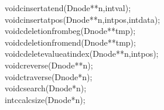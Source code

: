 \documentclass[a4paper, 9pt]{article}
\newcommand\SPC{\hspace*{0.6em}}
\newcommand{\CppAIdentifier}[1]{\textcolor[rgb]{0.88,0.89,0.89}{#1}}
\newcommand{\CppAReservedWord}[1]{\textcolor[rgb]{0.4,0.55,0.69}{#1}}
\newcommand{\CppASpace}[1]{\colorbox[rgb]{0.16,0.19,0.2}{#1}}
\newcommand{\CppASymbol}[1]{\textcolor[rgb]{0.91,0.89,0.72}{#1}}
\begin{document}
\begin{ttfamily}
\CppAReservedWord{void}\CppASpace{\SPC }\CppAIdentifier{cinsertatend}\CppASymbol{(}\CppASpace{\SPC }\CppAIdentifier{Dnode}\CppASymbol{*}\CppASymbol{*}\CppASpace{\SPC }\CppAIdentifier{n}\CppASymbol{,}\CppAReservedWord{int}\CppASpace{\SPC }\CppAIdentifier{val}\CppASymbol{)}\CppASymbol{;}\\
\CppAReservedWord{void}\CppASpace{\SPC }\CppAIdentifier{cinsertatpos}\CppASymbol{(}\CppAIdentifier{Dnode}\CppASymbol{*}\CppASymbol{*}\CppASpace{\SPC }\CppAIdentifier{n}\CppASymbol{,}\CppAReservedWord{int}\CppASpace{\SPC }\CppAIdentifier{pos}\CppASymbol{,}\CppAReservedWord{int}\CppASpace{\SPC }\CppAIdentifier{data}\CppASymbol{)}\CppASymbol{;}\\
\CppAReservedWord{void}\CppASpace{\SPC }\CppAIdentifier{cdeletionfrombeg}\CppASymbol{(}\CppAIdentifier{Dnode}\CppASymbol{*}\CppASymbol{*}\CppASpace{\SPC }\CppAIdentifier{tmp}\CppASpace{\SPC }\CppASymbol{)}\CppASymbol{;}\\
\CppAReservedWord{void}\CppASpace{\SPC }\CppAIdentifier{cdeletionfromend}\CppASymbol{(}\CppAIdentifier{Dnode}\CppASymbol{*}\CppASymbol{*}\CppASpace{\SPC }\CppAIdentifier{tmp}\CppASpace{\SPC }\CppASymbol{)}\CppASymbol{;}\\
\CppAReservedWord{void}\CppASpace{\SPC }\CppAIdentifier{cdeletevalueatindex}\CppASymbol{(}\CppAIdentifier{Dnode}\CppASymbol{*}\CppASymbol{*}\CppASpace{\SPC }\CppAIdentifier{n}\CppASymbol{,}\CppAReservedWord{int}\CppASpace{\SPC }\CppAIdentifier{pos}\CppASymbol{)}\CppASymbol{;}\\
\CppAReservedWord{void}\CppASpace{\SPC }\CppAIdentifier{creverse}\CppASymbol{(}\CppAIdentifier{Dnode}\CppASymbol{*}\CppASymbol{*}\CppASpace{\SPC }\CppAIdentifier{n}\CppASymbol{)}\CppASymbol{;}\\
\CppAReservedWord{void}\CppASpace{\SPC }\CppAIdentifier{ctraverse}\CppASymbol{(}\CppAIdentifier{Dnode}\CppASymbol{*}\CppASpace{\SPC }\CppAIdentifier{n}\CppASymbol{)}\CppASymbol{;}\\
\CppAReservedWord{void}\CppASpace{\SPC }\CppAIdentifier{csearch}\CppASymbol{(}\CppAIdentifier{Dnode}\CppASymbol{*}\CppASpace{\SPC }\CppAIdentifier{n}\CppASymbol{)}\CppASymbol{;}\\
\CppAReservedWord{int}\CppASpace{\SPC }\CppAIdentifier{ccalcsize}\CppASymbol{(}\CppAIdentifier{Dnode}\CppASpace{\SPC }\CppASymbol{*}\CppAIdentifier{n}\CppASymbol{)}\CppASymbol{;}\\
\\
\\
\\
\\

\end{ttfamily}
\end{document}
